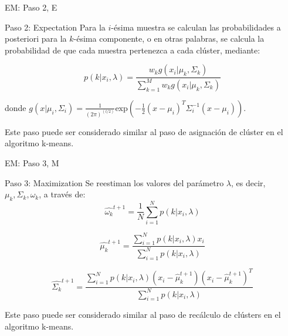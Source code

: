 \documentclass[xcolor=x11names,compress]{beamer}
\renewcommand{\(}{\begin{columns}}
\renewcommand{\)}{\end{columns}}
\newcommand{\<}[1]{\begin{column}{#1}}
\renewcommand{\>}{\end{column}}
\begin{document}
\begin{frame}{EM: Paso 2, E}
\begin{exampleblock}{Paso 2: Expectation}
Para la $i$-ésima muestra se calculan las probabilidades a posteriori para la $k$-ésima componente, o en otras palabras, se calcula la probabilidad de que cada muestra pertenezca a cada clúster, mediante:

\begin{equation}
p(k|x_i,\lambda) = \frac{w_k g(x_i | \mu_k,\Sigma_k)}{\sum_{k=1}^{M} w_k g(x_i|\mu_k,\Sigma_k)}
\end{equation}

donde $g(x|\mu _i,\Sigma_i)  = \frac{1}{(2 \pi)^{(l/2)}}\text{exp} \left(  -\frac{1}{2}(x-\mu _i)^T \Sigma _i^{-1} (x-\mu _i) \right)$.

Este paso puede ser considerado similar al paso de asignación de clúster en el algoritmo k-means.
\end{exampleblock}
\end{frame}

\begin{frame}{EM: Paso 3, M}
\begin{exampleblock}{Paso 3: Maximization}
Se reestiman los valores del parámetro $\lambda$, es decir, $\mu_k, \Sigma_k, \omega_k$, a través de:
\begin{equation}
	\hat{\omega _k}^{t+1} = \frac{1}{N} \sum_{i=1}^{N} p(k|x_i,\lambda)
\end{equation}

\begin{equation}
	\hat{\mu _k}^{t+1} = \frac{\sum_{i=1}^{N} p(k|x_i,\lambda) x_i}{\sum_{i=1}^{N} p(k|x_i,\lambda)}
\end{equation}

\begin{equation}
	\hat{\Sigma _k}^{t+1} = \frac{\sum_{i=1}^{N} p\left(  k|x_i,\lambda \right ) \left( x_i - \hat{\mu}_k^{t+1} \right ) \left( x_i - \hat{\mu}_k^{t+1} \right )^T}{\sum_{i=1}^{N} p\left(  k|x_i,\lambda \right )}
\end{equation}

Este paso puede ser considerado similar al paso de recálculo de clústers en el algoritmo k-means.
\end{exampleblock}
\end{frame}
\end{document}
